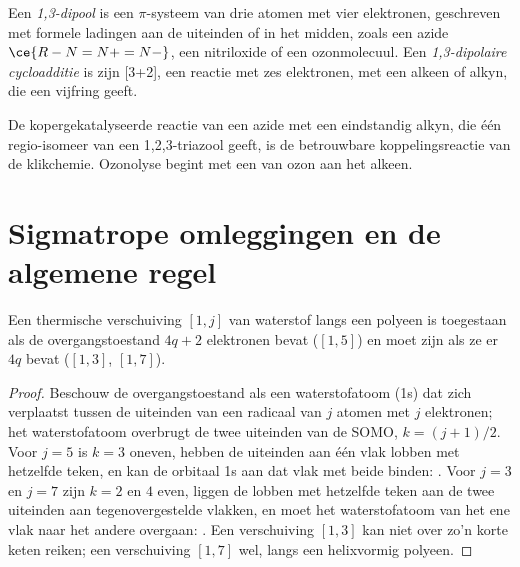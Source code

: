 \begin{definition}\label{def:b3:pericyclic:dipolar}
Een \emph{1,3-dipool} is een $\pi$-systeem van drie atomen met vier
elektronen, geschreven met formele ladingen aan de uiteinden of in het
midden, zoals een
azide $\ce{R-N=N+=N-}$, een nitriloxide of een ozonmolecuul. Een
\emph{1,3-dipolaire
cycloadditie} is zijn 
[3+2], een reactie met zes elektronen, met een alkeen of alkyn, die een
vijfring geeft.
\end{definition}

De kopergekatalyseerde reactie van een azide met een eindstandig alkyn,
die één regio-isomeer van een 1,2,3-triazool geeft, is de betrouwbare
koppelingsreactie van de klikchemie. Ozonolyse begint met een
 van ozon aan het alkeen.

\section{Sigmatrope omleggingen en de algemene regel}

\begin{proposition}[Waterstofverschuivingen]\label{prop:b3:pericyclic:sigmatropic-h}
Een thermische verschuiving $[1, j]$ van waterstof langs een polyeen is  toegestaan als de
overgangstoestand $4q + 2$ elektronen bevat ($[1,5]$) en moet  zijn als ze er $4q$ bevat
($[1,3]$, $[1,7]$).
\end{proposition}

\begin{proof}
Beschouw de overgangstoestand als een waterstofatoom (1s) dat zich
verplaatst tussen de uiteinden van een
radicaal van $j$ atomen met $j$ elektronen; het waterstofatoom overbrugt de twee uiteinden van de
SOMO, $k = (j + 1)/2$. Voor $j = 5$ is $k = 3$ oneven, hebben de uiteinden aan één vlak lobben met hetzelfde teken,
en kan de orbitaal 1s aan dat vlak met beide binden: . Voor $j = 3$ en $j = 7$
zijn $k = 2$ en $4$ even, liggen de lobben met hetzelfde teken aan de twee uiteinden aan tegenovergestelde vlakken, en
moet het waterstofatoom van het ene vlak naar het andere overgaan:
. Een verschuiving $[1,3]$ kan niet over zo'n korte keten reiken; een verschuiving $[1,7]$ wel, langs een
helixvormig polyeen.
\end{proof}

